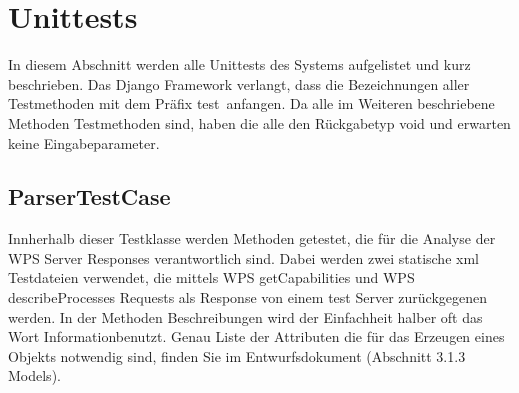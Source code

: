 \chapter{\gls{Unittest}s}
    In diesem Abschnitt werden alle Unittests des Systems aufgelistet und kurz beschrieben. \newline
    Das Django Framework verlangt, dass die Bezeichnungen aller Testmethoden mit dem Präfix \glqq test\grqq \ anfangen. \newline 
    Da alle im Weiteren beschriebene Methoden Testmethoden sind, haben die alle den Rückgabetyp void und erwarten keine Eingabeparameter.  
    \section{ParserTestCase}
    
    Innherhalb dieser Testklasse werden Methoden getestet, die für die Analyse der WPS Server Responses verantwortlich sind. Dabei werden zwei statische xml Testdateien verwendet, die mittels WPS getCapabilities und WPS describeProcesses Requests als Response von einem test Server zurückgegenen werden. \newline
    In der Methoden Beschreibungen wird der Einfachheit halber oft das Wort \glqq Information\grqq \space benutzt. Genau Liste der Attributen die für das Erzeugen eines Objekts notwendig sind, finden Sie im Entwurfsdokument (Abschnitt 3.1.3 Models).
	
